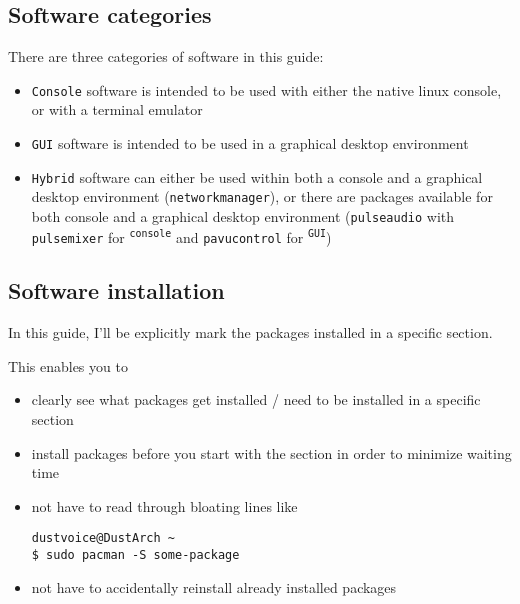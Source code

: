\documentclass[10pt]{dustdoc}
\begin{document}

\subsection{Software categories}
\label{sec:software-categories}

There are three categories of software in this guide:

\begin{itemize}
    \item \texttt{Console} software is intended to be used with either the native linux console, or with a terminal emulator

    \item \texttt{GUI} software is intended to be used in a graphical desktop environment

    \item \texttt{Hybrid} software can either be used within both a console and a graphical desktop environment (\texttt{networkmanager}), or there are packages available for both console and a graphical desktop environment (\texttt{pulseaudio} with \texttt{pulsemixer} for \textsuperscript{\texttt{console}} and \texttt{pavucontrol} for \textsuperscript{\texttt{GUI}})
\end{itemize}

\subsection{Software installation}
\label{sec:software-installation}
In this guide, I’ll be explicitly mark the packages installed in a specific section.

This enables you to

\begin{itemize}
    \item clearly see what packages get installed / need to be installed in a specific section

    \item install packages before you start with the section in order to minimize waiting time

    \item not have to read through bloating lines like

        \begin{verbatim}
dustvoice@DustArch ~
$ sudo pacman -S some-package
        \end{verbatim}

    \item not have to accidentally reinstall already installed packages
\end{itemize}
\end{document}
